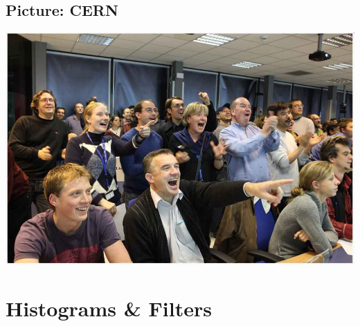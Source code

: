 \subsection{Picture: CERN}
\begin{frame}



\begin{minipage}{0.49\textwidth}
  \end{minipage} \begin{minipage}{0.49\textwidth}

\includegraphics[width=\textwidth]{Figures Lecture on Datanalysis/ATLAS_Energy_People.jpg}
\end{minipage}
\end{frame}



    
\section{Histograms \& Filters}

